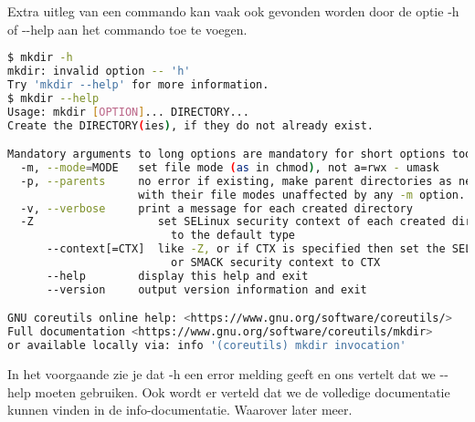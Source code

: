 Extra uitleg van een commando kan vaak ook gevonden worden door de optie -h of -{}-help aan het commando toe te voegen.

\begin{lstlisting}[language=bash]
$ mkdir -h
mkdir: invalid option -- 'h'
Try 'mkdir --help' for more information.
$ mkdir --help
Usage: mkdir [OPTION]... DIRECTORY...
Create the DIRECTORY(ies), if they do not already exist.

Mandatory arguments to long options are mandatory for short options too.
  -m, --mode=MODE   set file mode (as in chmod), not a=rwx - umask
  -p, --parents     no error if existing, make parent directories as needed,
                    with their file modes unaffected by any -m option.
  -v, --verbose     print a message for each created directory
  -Z                   set SELinux security context of each created directory
                         to the default type
      --context[=CTX]  like -Z, or if CTX is specified then set the SELinux
                         or SMACK security context to CTX
      --help        display this help and exit
      --version     output version information and exit

GNU coreutils online help: <https://www.gnu.org/software/coreutils/>
Full documentation <https://www.gnu.org/software/coreutils/mkdir>
or available locally via: info '(coreutils) mkdir invocation'
\end{lstlisting}


In het voorgaande zie je dat -h een error melding geeft en ons vertelt dat we -{}-help moeten gebruiken. Ook wordt er verteld dat we de volledige documentatie kunnen vinden in de info-documentatie. Waarover later meer.

